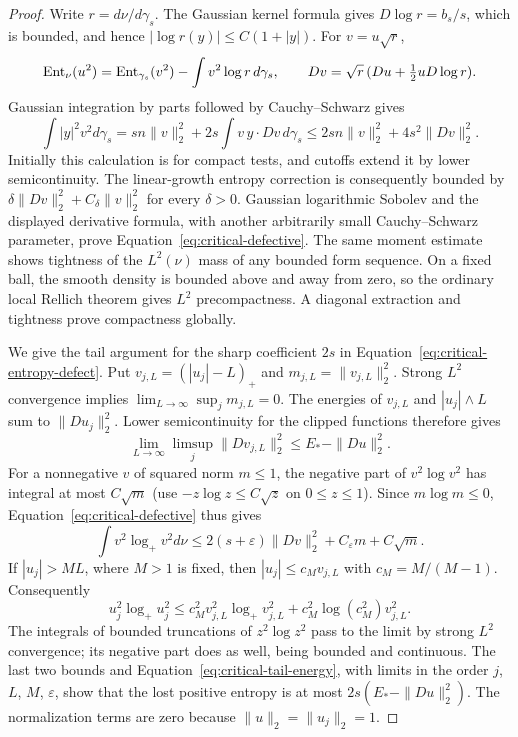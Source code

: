\begin{proof}
Write $r=d\nu/d\gamma_s$. The Gaussian kernel formula gives
$D\log r=b_s/s$, which is bounded, and hence
$|\log r(y)|\le C(1+|y|)$. For $v=u\sqrt r$,
\[
 \operatorname{Ent}_\nu(u^2)=\operatorname{Ent}_{\gamma_s}(v^2)
                         -\int v^2\log r\,d\gamma_s,
 \qquad Dv=\sqrt r\,(Du+\tfrac12uD\log r).
\]
Gaussian integration by parts followed by Cauchy--Schwarz gives
\[
 \int |y|^2v^2d\gamma_s
 =sn\|v\|_2^2+2s\int v\,y\cdot Dv\,d\gamma_s
 \le2sn\|v\|_2^2+4s^2\|Dv\|_2^2.
\]
Initially this calculation is for compact tests, and cutoffs extend
it by lower semicontinuity. The linear-growth entropy correction
is consequently bounded by
$\delta\|Dv\|_2^2+C_\delta\|v\|_2^2$ for every $\delta>0$.
Gaussian logarithmic Sobolev and the displayed derivative formula,
with another arbitrarily small Cauchy--Schwarz parameter, prove
Equation~\eqref{eq:critical-defective}. The same moment estimate
shows tightness of the $L^2(\nu)$ mass of any bounded form
sequence. On a fixed ball, the smooth density is bounded above
and away from zero, so the ordinary local Rellich theorem gives
$L^2$ precompactness. A diagonal extraction and tightness prove
compactness globally.

We give the tail argument for the sharp coefficient $2s$ in
Equation~\eqref{eq:critical-entropy-defect}. Put
$v_{j,L}=(|u_j|-L)_+$ and $m_{j,L}=\|v_{j,L}\|_2^2$.
Strong $L^2$ convergence implies
$\lim_{L\to\infty}\sup_jm_{j,L}=0$. The energies of
$v_{j,L}$ and $|u_j|\wedge L$ sum to $\|Du_j\|_2^2$.
Lower semicontinuity for the clipped functions therefore gives
\begin{equation}\label{eq:critical-tail-energy}
 \lim_{L\to\infty}\limsup_j\|Dv_{j,L}\|_2^2
 \le E_*-\|Du\|_2^2.
\end{equation}
For a nonnegative $v$ of squared norm $m\le1$, the negative
part of $v^2\log v^2$ has integral at most $C\sqrt m$
(use $-z\log z\le C\sqrt z$ on $0\le z\le1$).
Since $m\log m\le0$, Equation~\eqref{eq:critical-defective}
thus gives
\[
 \int v^2\log_+v^2d\nu
 \le2(s+\varepsilon)\|Dv\|_2^2
          +C_\varepsilon m+C\sqrt m.
\]
If $|u_j|>ML$, where $M>1$ is fixed, then
$|u_j|\le c_M v_{j,L}$ with $c_M=M/(M-1)$. Consequently
\[
 u_j^2\log_+u_j^2
 \le c_M^2v_{j,L}^2\log_+v_{j,L}^2
                +c_M^2\log(c_M^2)v_{j,L}^2.
\]
The integrals of bounded truncations of $z^2\log z^2$ pass to
the limit by strong $L^2$ convergence; its negative part does as
well, being bounded and continuous. The last two bounds and
Equation~\eqref{eq:critical-tail-energy}, with limits in the order
$j$, $L$, $M$, $\varepsilon$, show that the lost positive
entropy is at most $2s(E_*-\|Du\|_2^2)$. The normalization
terms are zero because $\|u\|_2=\|u_j\|_2=1$.
\end{proof}

